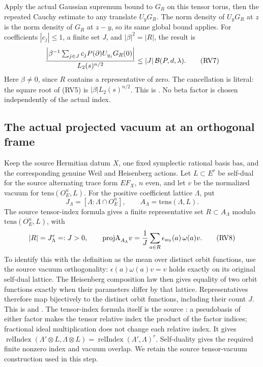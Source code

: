 Apply the actual Gaussian supremum bound to \(G_R\) on this
tensor torus, then the repeated Cauchy estimate to any translate
\(U_yG_R\). The norm density of \(U_yG_R\) at \(z\) is the
norm density of \(G_R\) at \(z-y\), so its same global bound
applies. For coefficients \(|c_j|\le1\), a finite set \(J\),
and \(|\beta|^2=|R|\), the result is
\[
 { \left|\beta^{-1}\sum_{j\in J}c_j
                         P(\partial)U_{y_j}G_R(0)\right|
                       \over L_2(s)^{n/2}}
                  \le |J|\,{\cal B}(P,d,\lambda).
 \tag{RV7}\label{eq:sr-source-normalized-isogeny-jet}
\]
Here \(\beta\ne0\), since \(R\) contains a representative of zero.
The cancellation is literal:
the square root of (RV5) is
\(|\beta|L_2(s)^{n/2}\).
This is
.
No beta factor is chosen independently of the actual index.

\subsection{The actual projected vacuum at an orthogonal frame}
Keep the source Hermitian datum \(X\), one fixed symplectic
rational basis \(\mathrm{bas}\), and the corresponding genuine
Weil and Heisenberg actions.
Let \(L\subset E^r\) be self-dual for the source alternating
trace form \(EF_X\), \(n\) even, and let \(v\) be the normalized
vacuum for \(\mathrm{tens}(O_E^n,L)\).
For the positive coefficient lattice \(\Lambda\), put
\[
 J_\Lambda=[\Lambda:\Lambda\cap O_E^n],\qquad
                         A_\Lambda=\mathrm{tens}(\Lambda,L).
\]
The source tensor-index formula gives a finite representative set
\(R\subset A_\Lambda\) modulo \(\mathrm{tens}(O_E^n,L)\), with
\[
                  |R|=J_\Lambda^r=:J>0,\qquad
 \mathrm{projA}_{A_\Lambda}v
       ={1\over J}\sum_{a\in R}\epsilon_{w_0}(a)\,\omega(a)v .
 \tag{RV8}\label{eq:sr-source-projector-representatives}
\]
To identify this with the definition as the mean over distinct
orbit functions, use the source vacuum orthogonality:
\(\epsilon(a)\omega(a)v=v\) holds exactly on its original
self-dual lattice. The Heisenberg composition law then gives
equality of two orbit functions exactly when their parameters
differ by that lattice.
Representatives therefore map bijectively to the distinct
orbit functions, including their count \(J\).
This is  and
.
The tensor-index formula itself is the source
:
a pseudobasis of either factor makes the tensor relative index
the product of the factor indices; fractional ideal multiplication
does not change each relative index.
It gives
\(\operatorname{relIndex}(\Lambda'\otimes L,\Lambda\otimes L)
 =\operatorname{relIndex}(\Lambda',\Lambda)^r\).
Self-duality gives the required finite nonzero index and vacuum
overlap. We retain the source tensor-vacuum construction used
in this step.

